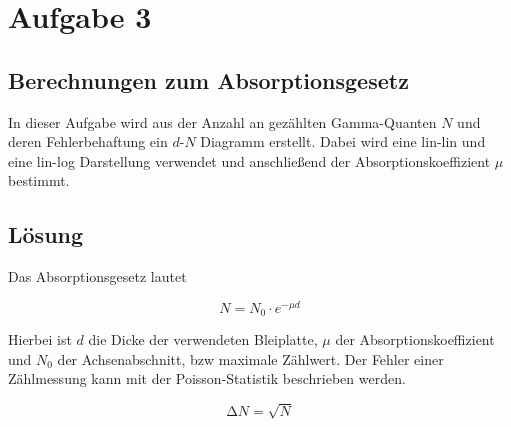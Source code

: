 \section{Aufgabe 3}
\subsection{Berechnungen zum Absorptionsgesetz}
In dieser Aufgabe wird aus der Anzahl an gezählten Gamma-Quanten $N$ und deren Fehlerbehaftung ein $d$-$N$ Diagramm erstellt.
Dabei wird eine lin-lin und eine lin-log Darstellung verwendet und anschließend der Absorptionskoeffizient $\mu$ bestimmt.
\subsection{Lösung}
Das Absorptionsgesetz lautet

\begin{equation}
N = N_{0} \cdot e^{- \mu d}
\label{eqn:absorptionsges}
\end{equation}
\begin{flushleft}
Hierbei ist $d$ die Dicke der verwendeten Bleiplatte, $\mu$ der Absorptionskoeffizient und $N_{0}$ der Achsenabschnitt, bzw maximale Zählwert.
Der Fehler einer Zählmessung kann mit der Poisson-Statistik beschrieben werden.
\end{flushleft}

\begin{equation}
\increment N = \sqrt{N}
\label{eqn:Poissonvert}
\end{equation}

